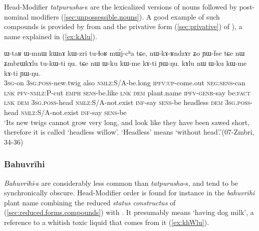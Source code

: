 Head-Modifier \textit{tatpurusha}-s are the lexicalized versions of nouns followed by post-nominal modifiers (\ref{sec:unpossessible.nouns}). A good example of such compounds is provided by  from  and the privative form  (\ref{sec:privative}) of ), a name explained in (\ref{ex:kAlu}). 

\begin{exe}
\ex \label{ex:kAlu}  
\gll ɯ-taʁ ɯ-mnɯ kɯnɤ kɯ-zri tu-ɬoʁ mɯ́j-cʰa tɕe, nɯ-kɤ-ʁndzɤr ʑo ɲɯ-fse tɕe nɯ ʑmbrɯkɤlu tu-kɯ-ti ŋu. tɕe nɯ ɯ-ku kɯ-me kɤ-ti ɲɯ-ŋu.  kɤlu nɯ ɯ-ku kɯ-me kɤ-ti ɲɯ-ŋu.\\
\textsc{3sg}-on \textsc{3sg.poss}-new.twig also \textsc{nmlz}:S/A-be.long \textsc{ipfv}:\textsc{up}-come.out \textsc{neg:sens}-can \textsc{lnk} \textsc{pfv}-\textsc{nmlz}:P-cut \textsc{emph} \textsc{sens}-be.like \textsc{lnk} \textsc{dem} plant.name \textsc{ipfv}-\textsc{genr}-say be:\textsc{fact} \textsc{lnk}  \textsc{dem} \textsc{3sg.poss}-head \textsc{nmlz}:S/A-not.exist \textsc{inf}-say \textsc{sens}-be headless \textsc{dem} \textsc{3sg.poss}-head \textsc{nmlz}:S/A-not.exist \textsc{inf}-say \textsc{sens}-be\\
\glt `Its new twigs cannot grow very long, and look like they have been sawed short, therefore it is called `headless willow'. `Headless' means `without head'.'(07-Zmbri, 34-36)
\end{exe}

\subsubsection{Bahuvrīhi} \label{sec:bahuvrihi.n.n}
\textit{Bahuvrīhi}-s are considerably less common than \textit{tatpurusha}-s, and tend to be synchronically obscure. Head-Modifier order is found for instance in the \textit{bahuvrīhi} plant name   combining the reduced \textit{status constructus} of  (\ref{sec:reduced.forms.compounds}) with . It presumably means `having dog milk', a reference to a whitish toxic liquid that comes from it (\ref{ex:khWlu}).

